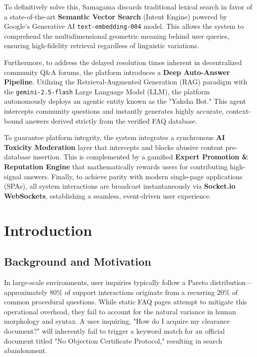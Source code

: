\documentclass[12pt,a4paper]{article}
\begin{document}
To definitively solve this, Samagama discards traditional lexical search in favor of a state-of-the-art \textbf{Semantic Vector Search} (Intent Engine) powered by Google's Generative AI \texttt{text-embedding-004} model. This allows the system to comprehend the multidimensional geometric meaning behind user queries, ensuring high-fidelity retrieval regardless of linguistic variations. 

Furthermore, to address the delayed resolution times inherent in decentralized community Q\&A forums, the platform introduces a \textbf{Deep Auto-Answer Pipeline}. Utilizing the Retrieval-Augmented Generation (RAG) paradigm with the \texttt{gemini-2.5-flash} Large Language Model (LLM), the platform autonomously deploys an agentic entity known as the "Yaksha Bot." This agent intercepts community questions and instantly generates highly accurate, context-bound answers derived strictly from the verified FAQ database.

To guarantee platform integrity, the system integrates a synchronous \textbf{AI Toxicity Moderation} layer that intercepts and blocks abusive content pre-database insertion. This is complemented by a gamified \textbf{Expert Promotion \& Reputation Engine} that mathematically rewards users for contributing high-signal answers. Finally, to achieve parity with modern single-page applications (SPAs), all system interactions are broadcast instantaneously via \textbf{Socket.io WebSockets}, establishing a seamless, event-driven user experience.

\newpage

\section{Introduction}
\vspace{0.5cm}

\subsection{Background and Motivation}
In large-scale environments, user inquiries typically follow a Pareto distribution—approximately 80\% of support interactions originate from a recurring 20\% of common procedural questions. While static FAQ pages attempt to mitigate this operational overhead, they fail to account for the natural variance in human morphology and syntax. A user inquiring, "How do I acquire my clearance document?" will inherently fail to trigger a keyword match for an official document titled "No Objection Certificate Protocol," resulting in search abandonment.
\end{document}
